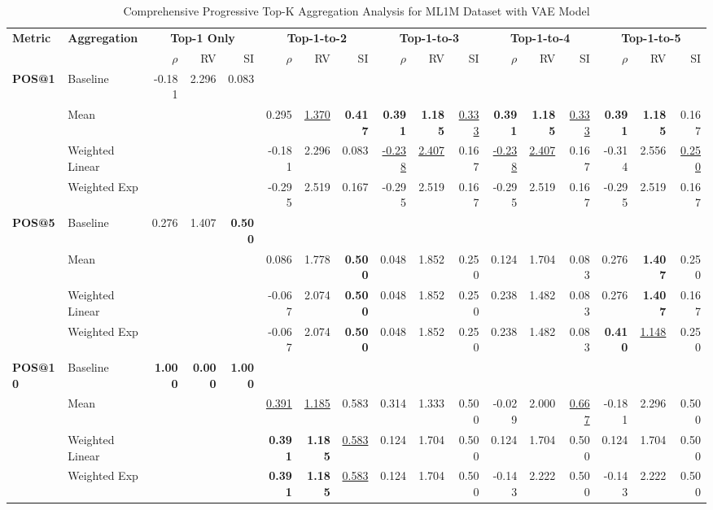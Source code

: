 \documentclass{article}
\begin{document}
\begin{table}[htbp]
\centering
\caption{Comprehensive Progressive Top-K Aggregation Analysis for ML1M Dataset with VAE Model}
\label{tab:ml1m_vae_progressive_topk_comprehensive}
\scriptsize
\begin{tabular}{@{}llrrr|rrr|rrr|rrr|rrr@{}}
\toprule
\multirow{2}{*}{\textbf{Metric}} & \multirow{2}{*}{\textbf{Aggregation}} & \multicolumn{3}{c|}{\textbf{Top-1 Only}} & \multicolumn{3}{c|}{\textbf{Top-1-to-2}} & \multicolumn{3}{c|}{\textbf{Top-1-to-3}} & \multicolumn{3}{c|}{\textbf{Top-1-to-4}} & \multicolumn{3}{c}{\textbf{Top-1-to-5}} \\
\cmidrule(lr){3-5} \cmidrule(lr){6-8} \cmidrule(lr){9-11} \cmidrule(lr){12-14} \cmidrule(lr){15-17}
& & $\rho$ & RV & SI & $\rho$ & RV & SI & $\rho$ & RV & SI & $\rho$ & RV & SI & $\rho$ & RV & SI \\
\midrule

\multirow{4}{*}{\textbf{POS@1}} 
& Baseline & -0.181 & 2.296 & 0.083 & & & & & & & & & & & & \\
& Mean & & & & 0.295 & \uline{1.370} & \textbf{0.417} & \textbf{0.391} & \textbf{1.185} & \uline{0.333} & \textbf{0.391} & \textbf{1.185} & \uline{0.333} & \textbf{0.391} & \textbf{1.185} & 0.167 \\
& Weighted Linear & & & & -0.181 & 2.296 & 0.083 & \uline{-0.238} & \uline{2.407} & 0.167 & \uline{-0.238} & \uline{2.407} & 0.167 & -0.314 & 2.556 & \uline{0.250} \\
& Weighted Exp & & & & -0.295 & 2.519 & 0.167 & -0.295 & 2.519 & 0.167 & -0.295 & 2.519 & 0.167 & -0.295 & 2.519 & 0.167 \\
\midrule

\multirow{4}{*}{\textbf{POS@5}} 
& Baseline & 0.276 & 1.407 & \textbf{0.500} & & & & & & & & & & & & \\
& Mean & & & & 0.086 & 1.778 & \textbf{0.500} & 0.048 & 1.852 & 0.250 & 0.124 & 1.704 & 0.083 & 0.276 & \textbf{1.407} & 0.250 \\
& Weighted Linear & & & & -0.067 & 2.074 & \textbf{0.500} & 0.048 & 1.852 & 0.250 & 0.238 & 1.482 & 0.083 & 0.276 & \textbf{1.407} & 0.167 \\
& Weighted Exp & & & & -0.067 & 2.074 & \textbf{0.500} & 0.048 & 1.852 & 0.250 & 0.238 & 1.482 & 0.083 & \textbf{0.410} & \uline{1.148} & 0.250 \\
\midrule

\multirow{4}{*}{\textbf{POS@10}} 
& Baseline & \textbf{1.000} & \textbf{0.000} & \textbf{1.000} & & & & & & & & & & & & \\
& Mean & & & & \uline{0.391} & \uline{1.185} & 0.583 & 0.314 & 1.333 & 0.500 & -0.029 & 2.000 & \uline{0.667} & -0.181 & 2.296 & 0.500 \\
& Weighted Linear & & & & \textbf{0.391} & \textbf{1.185} & \uline{0.583} & 0.124 & 1.704 & 0.500 & 0.124 & 1.704 & 0.500 & 0.124 & 1.704 & 0.500 \\
& Weighted Exp & & & & \textbf{0.391} & \textbf{1.185} & \uline{0.583} & 0.124 & 1.704 & 0.500 & -0.143 & 2.222 & 0.500 & -0.143 & 2.222 & 0.500 \\
\midrule


\end{tabular}
\end{table}
\end{document}
